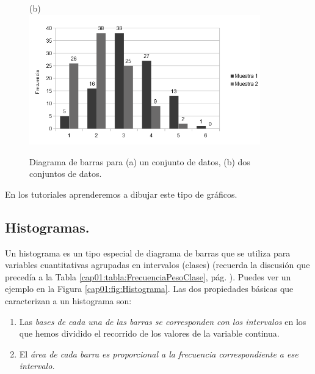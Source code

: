 \begin{figure}[phtb]
\begin{center}
\begin{bn}
    (b)\\
    \includegraphics[width=10cm]{../fig/Cap01-DiagramaBarrasDosMuestras-bn.png}\\[3mm]
	\end{bn}
	\caption{Diagrama de barras para (a) un conjunto de datos, (b) dos conjuntos de datos.}
	\label{cap01:fig:DiagramaBarras}
    \end{center}
  \end{figure}

En los tutoriales aprenderemos a dibujar este tipo de gráficos.

%
\subsection{Histogramas.}
\label{cap01:sec:Histogramas}

Un {\sf histograma}   es un tipo especial de
diagrama   de barras que se utiliza para variables cuantitativas agrupadas en
intervalos (clases) (recuerda la discusión que precedía a la Tabla \ref{cap01:tabla:FrecuenciaPesoClase}, pág.
\pageref{cap01:tabla:FrecuenciaPesoClase}). Puedes ver un ejemplo en la Figura \ref{cap01:fig:Histograma}. Las
dos  propiedades básicas que caracterizan a un histograma son:
    \begin{enumerate}
      \item Las {\em bases de cada una de las barras se corresponden con
      los intervalos} en los que hemos dividido el recorrido de los valores de la
      variable continua.

      \item El {\em área de cada barra es proporcional a la
      frecuencia  correspondiente a ese intervalo.}
    \end{enumerate}

